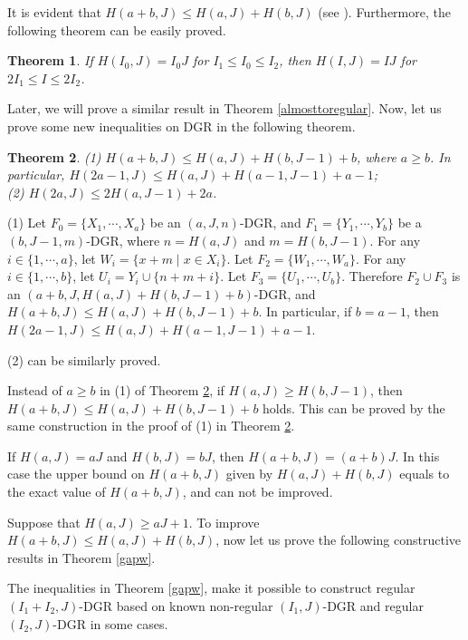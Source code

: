 \documentclass[preprint,12pt]{elsarticle}
\newtheorem{thm}{Theorem}
\begin{document}
It is evident that $H(a+b,J) \leq H(a,J) + H(b,J)$ (see \cite{Klove}). Furthermore, the following theorem can be easily proved.

\begin{thm}
\label{tI0}
If $H(I_0,J) = I_0J$ for $I_1 \le I_0 \le I_2$, then $H(I,J) = IJ$ for $2I_1 \le I \le 2I_2$.
\end{thm}

Later, we will prove a similar result in Theorem \ref{almosttoregular}.
Now, let us prove some new inequalities on DGR in the following theorem.


\begin{thm}
\label{tHa_b}
(1) $H(a+b,J) \leq H(a,J)+H(b,J-1)+b$, where $a \geq b$. In particular, $H(2a-1,J) \leq H(a,J)+H(a-1,J-1)+a-1$;  \\
(2) $H(2a,J) \leq 2H(a,J-1)+2a$.
\end{thm}
\begin{pf}
(1) Let $F_0= \{X_1, \cdots, X_a\}$ be an $(a,J,n)$-DGR, and
$F_1= \{Y_1, \cdots, Y_b\}$ be a $(b,J-1,m)$-DGR, where $n=H(a,J)$
and $m=H(b,J-1)$. For any $i \in \{1, \cdots, a\}$, let $W_i =
\{x+m \;|\; x \in X_i\}$. Let $F_2= \{W_1, \cdots, W_a\}$. For
any $i \in \{1, \cdots, b\}$, let $U_i = Y_i \cup
\{n+m+i\}$. Let $F_3= \{U_1, \cdots, U_b\}$. Therefore
$F_2 \cup F_3$ is an $(a+b,J,H(a,J)+H(b,J-1)+b)$-DGR, and
$H(a+b,J) \leq H(a,J)+H(b,J-1)+b$.
In particular, if $b=a-1$, then $H(2a-1,J) \leq H(a,J) +H(a-1,J-1)+a-1$.

(2) can be similarly proved.
\end{pf}


Instead of $a \geq b$ in (1) of Theorem \ref{tHa_b},
if $H(a,J) \ge H(b,J-1)$, then $H(a+b,J) \leq H(a,J)+H(b,J-1)+b$ holds.
This can be proved by the same construction in the proof of (1) in Theorem \ref{tHa_b}.



If $H(a,J) = aJ$ and $H(b,J) = bJ$, then $H(a+b,J) = (a+b)J$.
In this case the upper bound on $H(a+b,J) $
given by $ H(a,J) + H(b,J)$ equals to the exact value of $H(a+b,J) $, and can not be improved.

Suppose that $H(a,J) \geq aJ+1$.
To improve $H(a+b,J) \leq H(a,J)+H(b,J)$, now let us prove the following constructive results
in Theorem \ref{gapw}.

The inequalities in Theorem \ref{gapw}, make it possible to construct
regular $(I_1 +I_2, J)$-DGR based on known non-regular $(I_1, J)$-DGR and regular $(I_2, J)$-DGR in some cases.
\end{document}
